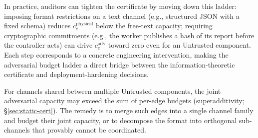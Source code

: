 \documentclass{article}
\begin{document}
In practice, auditors can tighten the certificate by moving down this ladder: imposing format restrictions on a text channel (e.g., structured JSON with a fixed schema) reduces $c_e^{\text{physical}}$ below the free-text capacity; requiring cryptographic commitments (e.g., the worker publishes a hash of its report before the controller acts) can drive $c_e^{\text{adv}}$ toward zero even for an Untrusted component. Each step corresponds to a concrete engineering intervention, making the adversarial budget ladder a direct bridge between the information-theoretic certificate and deployment-hardening decisions.

For channels shared between multiple Untrusted components, the joint adversarial capacity may exceed the sum of per-edge budgets (superadditivity; \S\ref{sec:static-cert}). The remedy is to merge such edges into a single channel family and budget their joint capacity, or to decompose the format into orthogonal sub-channels that provably cannot be coordinated.
\end{document}
